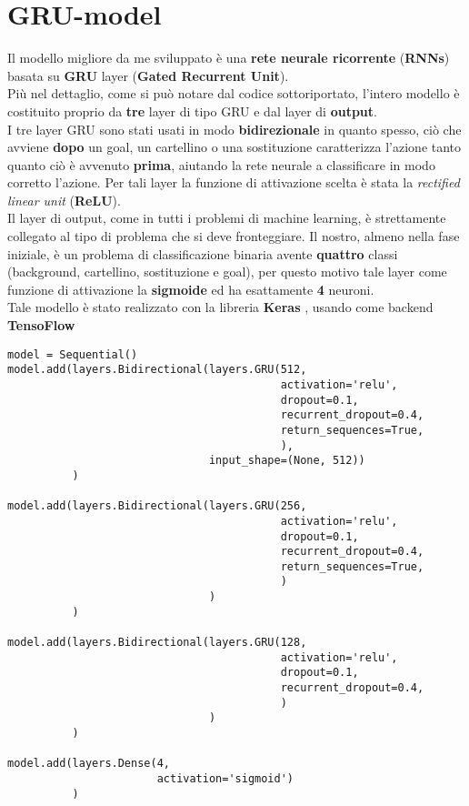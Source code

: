 \section{GRU-model}
\label{section : grumodel}
Il modello migliore da me sviluppato è una \textbf{rete neurale ricorrente} (\textbf{RNNs}) basata su \textbf{GRU} layer (\textbf{Gated Recurrent Unit}). 
\\Più nel dettaglio, come si può notare dal codice sottoriportato, l'intero modello è costituito proprio da \textbf{tre} layer di tipo GRU e dal layer di \textbf{output}.
\\I tre layer GRU sono stati usati in modo \textbf{bidirezionale} in quanto spesso, ciò che avviene \textbf{dopo} un goal, un cartellino o una sostituzione caratterizza l'azione tanto quanto ciò è avvenuto \textbf{prima}, aiutando la rete neurale a classificare in modo corretto l'azione. Per tali layer la funzione di attivazione scelta è stata la \textit{rectified linear unit} (\textbf{ReLU}). \cite{DeepLearningPython}
\\Il layer di output, come in tutti i problemi di machine learning, è strettamente collegato al tipo di problema che si deve fronteggiare. Il nostro, almeno nella fase iniziale, è un problema di classificazione binaria avente \textbf{quattro} classi (background, cartellino, sostituzione e goal), per questo motivo tale layer come funzione di attivazione la \textbf{sigmoide} ed ha esattamente \textbf{4} neuroni.
\\Tale modello è stato realizzato con la libreria \textbf{Keras} \cite{chollet2015keras}, usando come backend \textbf{TensoFlow} \cite{tensorflow2015-whitepaper}
\begin{verbatim}
model = Sequential()
model.add(layers.Bidirectional(layers.GRU(512,
                                          activation='relu',
                                          dropout=0.1,
                                          recurrent_dropout=0.4,
                                          return_sequences=True,
                                          ),
                               input_shape=(None, 512))
          )

model.add(layers.Bidirectional(layers.GRU(256,
                                          activation='relu',
                                          dropout=0.1,
                                          recurrent_dropout=0.4,
                                          return_sequences=True,
                                          )
                               )
          )

model.add(layers.Bidirectional(layers.GRU(128,
                                          activation='relu',
                                          dropout=0.1,
                                          recurrent_dropout=0.4,
                                          )
                               )
          )

model.add(layers.Dense(4,
                       activation='sigmoid')
          )
\end{verbatim}
